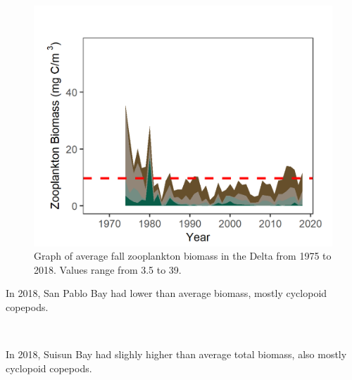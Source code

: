 \documentclass[
]{book}
\begin{document}
\begin{panel-grid}
\begin{columns-nocenter}
\begin{column800}
\begin{expand}
\begin{figure}
\includegraphics[width=15.25in]{figures/zoops_dtfall} \caption{Graph of average fall zooplankton biomass in the Delta from 1975 to 2018. Values range from 3.5 to 39.}\label{fig:unnamed-chunk-117}
\end{figure}

\end{expand}

\end{column800}

\end{columns-nocenter}

\begin{columns-nocenter}

\begin{column800}

In 2018, San Pablo Bay had lower than average biomass, mostly cyclopoid copepods.

\end{column800}

\begin{column40}

~

\end{column40}

\begin{column800}

In 2018, Suisun Bay had slighly higher than average total biomass, also mostly cyclopoid copepods.

\end{column800}


\end{columns-nocenter}
\end{panel-grid}
\end{document}
